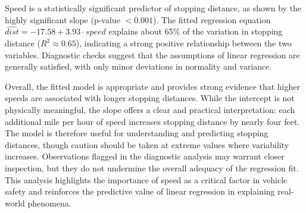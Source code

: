 \documentclass{article}
\begin{document}
\indent  Speed is a statistically significant predictor of stopping distance, as shown by the highly significant slope (p-value $< 0.001$). The fitted regression equation $\hat{dist} = -17.58 + 3.93 \cdot speed$ explains about 65\% of the variation in stopping distance ($R^2 \approx 0.65$), indicating a strong positive relationship between the two variables. Diagnostic checks suggest that the assumptions of linear regression are generally satisfied, with only minor deviations in normality and variance. 

\indent Overall, the fitted model is appropriate and provides strong evidence that higher speeds are associated with longer stopping distances. While the intercept is not physically meaningful, the slope offers a clear and practical interpretation: each additional mile per hour of speed increases stopping distance by nearly four feet. The model is therefore useful for understanding and predicting stopping distances, though caution should be taken at extreme values where variability increases. Observations flagged in the diagnostic analysis may warrant closer inspection, but they do not undermine the overall adequacy of the regression fit. This analysis highlights the importance of speed as a critical factor in vehicle safety and reinforces the predictive value of linear regression in explaining real-world phenomena.
\end{document}
